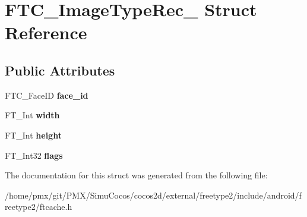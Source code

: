 \hypertarget{structFTC__ImageTypeRec__}{}\section{F\+T\+C\+\_\+\+Image\+Type\+Rec\+\_\+ Struct Reference}
\label{structFTC__ImageTypeRec__}
\subsection*{Public Attributes}
\begin{DoxyCompactItemize}
\item 
\mbox{\label{structFTC__ImageTypeRec___a9851b8d4a06baacd18d5b9856fd85abd}} 
F\+T\+C\+\_\+\+Face\+ID {\bfseries face\+\_\+id}
\item 
\mbox{\label{structFTC__ImageTypeRec___af1a4cccbabb0f5852ed755a12ed08dd8}} 
F\+T\+\_\+\+Int {\bfseries width}
\item 
\mbox{\label{structFTC__ImageTypeRec___adb56a9d18a3f522d713d0ba01c1a8778}} 
F\+T\+\_\+\+Int {\bfseries height}
\item 
\mbox{\label{structFTC__ImageTypeRec___a391782ed8c67de86591c71f276ea6454}} 
F\+T\+\_\+\+Int32 {\bfseries flags}
\end{DoxyCompactItemize}


The documentation for this struct was generated from the following file\+:\begin{DoxyCompactItemize}
\item 
/home/pmx/git/\+P\+M\+X/\+Simu\+Cocos/cocos2d/external/freetype2/include/android/freetype2/ftcache.\+h\end{DoxyCompactItemize}
